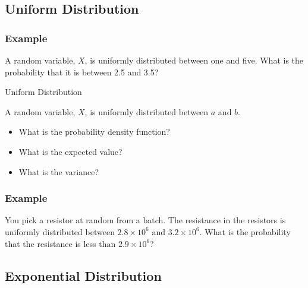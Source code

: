 \subsection{Uniform Distribution}


 \begin{frame}
 \frametitle{Example}

 A random variable, $X$, is uniformly distributed between one and
 five. What is the probability that it is between 2.5 and 3.5?

 \end{frame}

\begin{frame}{Uniform Distribution}

  A random variable, $X$, is uniformly distributed between $a$ and
  $b$.

  \vfill

  \begin{itemize}
  \item What is the probability density function?
  \item What is the expected value?
  \item What is the variance?
  \end{itemize}

  \vfill

\end{frame}



 \begin{frame}
 \frametitle{Example}

 You pick a resistor at random from a batch. The resistance in the
 resistors is uniformly distributed between $2.8\times 10^6$ and
 $3.2\times 10^6$. What is the probability that the resistance is less
 than $2.9\times 10^6$?

\end{frame}

\subsection{Exponential Distribution}

